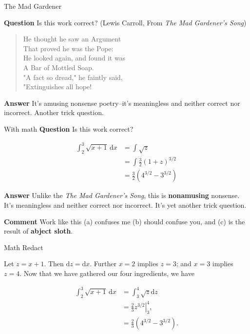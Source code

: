 \documentclass[fleqn]{beamer}
\theoremstyle{definition}
\begin{document}
\begin{frame}{The Mad Gardener}

  \textbf{Question} Is this work correct? 
   (Lewis Carroll, From \emph{The Mad Gardener’s Song})

   \vspace{0.5in}
  \begin{quote}
    He thought he saw an Argument\\
  That proved he was the Pope:\\
  He looked again, and found it was\\
  A Bar of Mottled Soap.\\
  "A fact so dread," he faintly said,\\
  "Extinguishes all hope! 
  \end{quote}
 
  \vspace{0.5in}
  \textbf{Answer} It's amusing nonsense poetry--it's meaningless
  and neither correct nor incorrect. Another trick question.
  
\end{frame}

\begin{frame}{With math}
  \textbf{Question} Is this work correct? 

  \begin{align*}
    \int_2^3 \sqrt{x+1} \, \mathrm{d}x &=  \int\sqrt{z}\\
                                       &= \int \frac{3}{2} (1+ z)^{3/2}\\
                                       &=  \frac{3}{2} (4^{3/2} - 3^{3/2})
  \end{align*}

  \textbf{Answer} Unlike the \emph{The Mad Gardener’s Song}, this is 
  \textbf{nonamusing} nonsense. It's 
  meaningless and neither correct nor incorrect. It's yet another 
  trick question.

  \vspace{0.5in}
  \textbf{Comment} Work like this (a) confuses me (b) should 
  confuse you, and (c) is the result of \textbf{abject sloth}.
\end{frame}

\begin{frame}{Math Redact}

  Let $z = x+1$. Then $\mathrm{d}z = \mathrm{d}x$. Further
  $x=2$ implies $z=3$; and $x=3$ implies $z=4$. Now that we
  have gathered our four ingredients, we have

\begin{align*}
    \int_2^3 \sqrt{x+1} \, \mathrm{d}x &=  \int_3^4 \sqrt{z} \mathrm{d}z\\
                                       &=  \left. \frac{2}{3} z^{3/2} \right |_{3}^4, \\
                                       &= \frac{2}{3} \left(4^{3/2} - 3^{3/2}\right).
  \end{align*}
\end{frame}
\end{document}
